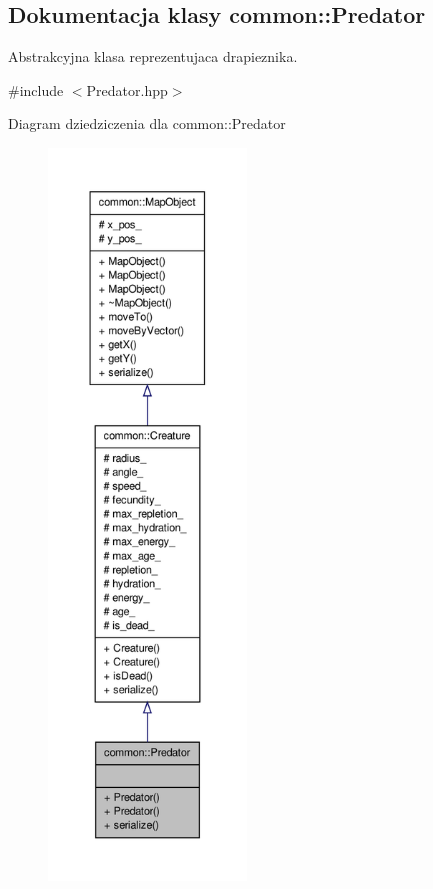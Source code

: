 \hypertarget{classcommon_1_1Predator}{\subsection{Dokumentacja klasy common\-:\-:Predator}
\label{classcommon_1_1Predator}
}


Abstrakcyjna klasa reprezentujaca drapieznika.  




{\ttfamily \#include $<$Predator.\-hpp$>$}



Diagram dziedziczenia dla common\-:\-:Predator
\nopagebreak
\begin{figure}[H]
\begin{center}
\leavevmode
\includegraphics[height=550pt]{classcommon_1_1Predator__inherit__graph}
\end{center}
\end{figure}


